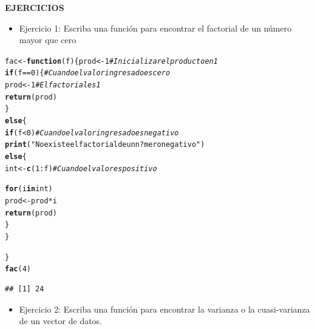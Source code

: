 \documentclass[12pt,letterpaper]{article}\usepackage[]{graphicx}\usepackage[]{color}
\makeatletter
\newcommand{\hlnum}[1]{\textcolor[rgb]{0.686,0.059,0.569}{#1}}%
\newcommand{\hlstr}[1]{\textcolor[rgb]{0.192,0.494,0.8}{#1}}%
\newcommand{\hlcom}[1]{\textcolor[rgb]{0.678,0.584,0.686}{\textit{#1}}}%
\newcommand{\hlopt}[1]{\textcolor[rgb]{0,0,0}{#1}}%
\newcommand{\hlstd}[1]{\textcolor[rgb]{0.345,0.345,0.345}{#1}}%
\newcommand{\hlkwa}[1]{\textcolor[rgb]{0.161,0.373,0.58}{\textbf{#1}}}%
\newcommand{\hlkwb}[1]{\textcolor[rgb]{0.69,0.353,0.396}{#1}}%
\newcommand{\hlkwc}[1]{\textcolor[rgb]{0.333,0.667,0.333}{#1}}%
\newcommand{\hlkwd}[1]{\textcolor[rgb]{0.737,0.353,0.396}{\textbf{#1}}}%
\newenvironment{kframe}{%
 \def\at@end@of@kframe{}%
 \ifinner\ifhmode%
  \def\at@end@of@kframe{\end{minipage}}%
  \begin{minipage}{\columnwidth}%
 \fi\fi%
 \def\FrameCommand##1{\hskip\@totalleftmargin \hskip-\fboxsep
 \colorbox{shadecolor}{##1}\hskip-\fboxsep
     \hskip-\linewidth \hskip-\@totalleftmargin \hskip\columnwidth}%
 \MakeFramed {\advance\hsize-\width
   \@totalleftmargin\z@ \linewidth\hsize
   \@setminipage}}%
 {\par\unskip\endMakeFramed%
 \at@end@of@kframe}
\newenvironment{knitrout}{}{} %
\makeatother
\begin{document}
\newpage
\begin{center}
\textbf {EJERCICIOS}
\end{center}
\begin{itemize}
\item Ejercicio 1: Escriba una funci\'on para encontrar el factorial de un n\'umero mayor que cero
\end{itemize}
\begin{knitrout}
\color{fgcolor}\begin{kframe}
\begin{alltt}
\hlstd{fac}\hlkwb{<-}\hlkwa{function}\hlstd{(}\hlkwc{f}\hlstd{)\{ prod}\hlkwb{<-}\hlnum{1} \hlcom{# Inicializar el producto en 1}
\hlkwa{if} \hlstd{(f}\hlopt{==}\hlnum{0}\hlstd{)\{} \hlcom{# Cuando el valor ingresado es cero}
  \hlstd{prod}\hlkwb{<-}\hlnum{1} \hlcom{# El factorial es 1}
  \hlkwd{return}\hlstd{(prod)}
\hlstd{\}}
  \hlkwa{else}\hlstd{\{}
    \hlkwa{if}\hlstd{(f}\hlopt{<}\hlnum{0}\hlstd{)} \hlcom{# Cuando el valor ingresado es negativo}
      \hlkwd{print}\hlstd{(}\hlstr{"No existe el factorial de un n?mero negativo"}\hlstd{)}
    \hlkwa{else} \hlstd{\{}
      \hlstd{int}\hlkwb{<-}\hlkwd{c}\hlstd{(}\hlnum{1}\hlopt{:}\hlstd{f)} \hlcom{# Cuando el valor es positivo}

      \hlkwa{for}\hlstd{(i} \hlkwa{in} \hlstd{int)}
        \hlstd{prod}\hlkwb{<-}\hlstd{prod} \hlopt{*} \hlstd{i}
      \hlkwd{return}\hlstd{(prod)}
    \hlstd{\}}
  \hlstd{\}}

  \hlstd{\}}
\hlkwd{fac}\hlstd{(}\hlnum{4}\hlstd{)}
\end{alltt}
\begin{verbatim}
## [1] 24
\end{verbatim}
\end{kframe}
\end{knitrout}
\begin{itemize}
\item Ejercicio 2: Escriba una funci\'on para encontrar la varianza o la cuasi-varianza de un vector de
datos.
\end{itemize}
\end{document}
